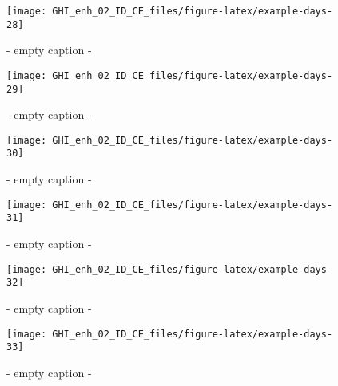 \documentclass[
  10pt,
  a4paper,oneside]{article}
\begin{document}
\begin{figure}[H]

{\centering \texttt{[image: GHI\_enh\_02\_ID\_CE\_files/figure-latex/example-days-28]} 

}

\caption{ - empty caption - }\label{fig:example-days-28}
\end{figure}

\begin{figure}[H]

{\centering \texttt{[image: GHI\_enh\_02\_ID\_CE\_files/figure-latex/example-days-29]} 

}

\caption{ - empty caption - }\label{fig:example-days-29}
\end{figure}

\begin{figure}[H]

{\centering \texttt{[image: GHI\_enh\_02\_ID\_CE\_files/figure-latex/example-days-30]} 

}

\caption{ - empty caption - }\label{fig:example-days-30}
\end{figure}

\begin{figure}[H]

{\centering \texttt{[image: GHI\_enh\_02\_ID\_CE\_files/figure-latex/example-days-31]} 

}

\caption{ - empty caption - }\label{fig:example-days-31}
\end{figure}

\begin{figure}[H]

{\centering \texttt{[image: GHI\_enh\_02\_ID\_CE\_files/figure-latex/example-days-32]} 

}

\caption{ - empty caption - }\label{fig:example-days-32}
\end{figure}

\begin{figure}[H]

{\centering \texttt{[image: GHI\_enh\_02\_ID\_CE\_files/figure-latex/example-days-33]} 

}

\caption{ - empty caption - }\label{fig:example-days-33}
\end{figure}
\end{document}
